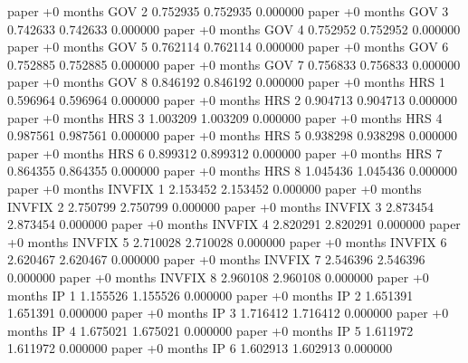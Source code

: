      paper +0 months      GOV                 2 0.752935       0.752935           0.000000
     paper +0 months      GOV                 3 0.742633       0.742633           0.000000
     paper +0 months      GOV                 4 0.752952       0.752952           0.000000
     paper +0 months      GOV                 5 0.762114       0.762114           0.000000
     paper +0 months      GOV                 6 0.752885       0.752885           0.000000
     paper +0 months      GOV                 7 0.756833       0.756833           0.000000
     paper +0 months      GOV                 8 0.846192       0.846192           0.000000
     paper +0 months      HRS                 1 0.596964       0.596964           0.000000
     paper +0 months      HRS                 2 0.904713       0.904713           0.000000
     paper +0 months      HRS                 3 1.003209       1.003209           0.000000
     paper +0 months      HRS                 4 0.987561       0.987561           0.000000
     paper +0 months      HRS                 5 0.938298       0.938298           0.000000
     paper +0 months      HRS                 6 0.899312       0.899312           0.000000
     paper +0 months      HRS                 7 0.864355       0.864355           0.000000
     paper +0 months      HRS                 8 1.045436       1.045436           0.000000
     paper +0 months   INVFIX                 1 2.153452       2.153452           0.000000
     paper +0 months   INVFIX                 2 2.750799       2.750799           0.000000
     paper +0 months   INVFIX                 3 2.873454       2.873454           0.000000
     paper +0 months   INVFIX                 4 2.820291       2.820291           0.000000
     paper +0 months   INVFIX                 5 2.710028       2.710028           0.000000
     paper +0 months   INVFIX                 6 2.620467       2.620467           0.000000
     paper +0 months   INVFIX                 7 2.546396       2.546396           0.000000
     paper +0 months   INVFIX                 8 2.960108       2.960108           0.000000
     paper +0 months       IP                 1 1.155526       1.155526           0.000000
     paper +0 months       IP                 2 1.651391       1.651391           0.000000
     paper +0 months       IP                 3 1.716412       1.716412           0.000000
     paper +0 months       IP                 4 1.675021       1.675021           0.000000
     paper +0 months       IP                 5 1.611972       1.611972           0.000000
     paper +0 months       IP                 6 1.602913       1.602913           0.000000
